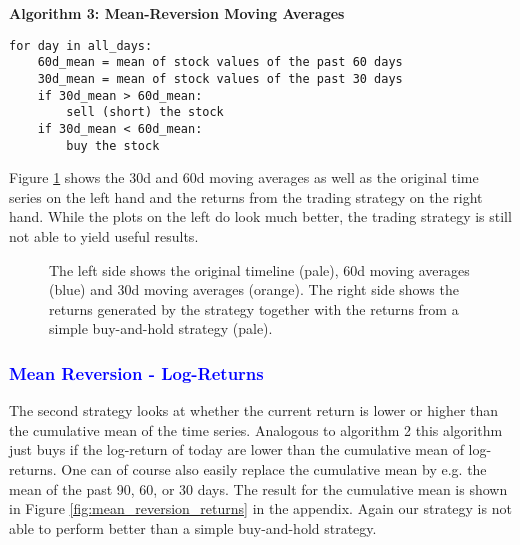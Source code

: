 \vspace{2ex}
\textbf{\small{Algorithm 3: Mean-Reversion Moving Averages}}
\vspace{-1ex}
\begin{verbatim}
for day in all_days: 
    60d_mean = mean of stock values of the past 60 days
    30d_mean = mean of stock values of the past 30 days
    if 30d_mean > 60d_mean:
        sell (short) the stock
    if 30d_mean < 60d_mean:
        buy the stock
\end{verbatim}

Figure \ref{fig:30d_60d_plot} shows the 30d and 60d moving averages as well as the original time series on the left hand and the returns from the trading strategy on the right hand. While the plots on the left do look much better, the trading strategy is still not able to yield useful results. 
\begin{figure}[h!]
    \centering
    \begin{minipage}[b]{0.49\textwidth}
        \centering
            \begin{adjustbox}{width=\textwidth,center}
               
            \end{adjustbox}
    \end{minipage}
    \hfill
    \begin{minipage}[b]{0.49\textwidth}
        \centering
        \begin{adjustbox}{width=\textwidth,center, scale={1}{1.2}}
            
        \end{adjustbox}
    \end{minipage}
    \caption{The left side shows the original timeline (pale), 60d moving averages (blue) and 30d moving averages (orange). The right side shows the returns generated by the strategy together with the returns from a simple buy-and-hold strategy (pale).}
    \label{fig:30d_60d_plot}
\end{figure}{}

\subsubsection{\textcolor{blue}{Mean Reversion - Log-Returns}}
The second strategy looks at whether the current return is lower or higher than the cumulative mean of the time series. Analogous to algorithm 2 this algorithm just buys if the log-return of today are lower than the cumulative mean of log-returns. One can of course also easily replace the cumulative mean by e.g. the mean of the past 90, 60, or 30 days. The result for the cumulative mean is shown in Figure \ref{fig:mean_reversion_returns} in the appendix. Again our strategy is not able to perform better than a simple buy-and-hold strategy. 

